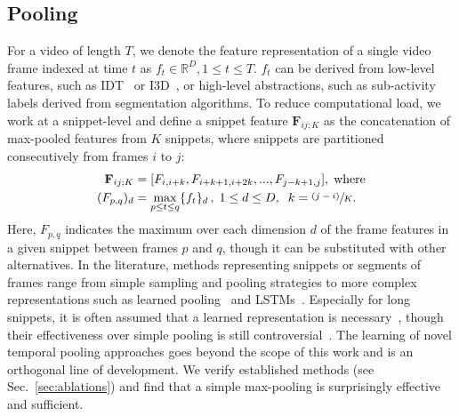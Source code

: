 \documentclass[runningheads]{llncs}
\begin{document}
\subsection{Pooling} 
For a video of length $T$, we denote the feature representation of a single video frame indexed at time $t$ as $f_t \in \mathbb{R}^{D}, 1\leq t \leq T$. $f_t$ can be derived from low-level features, such as IDT~\cite{wang2013action} or I3D~\cite{carreira2017quo}, or high-level abstractions, such as sub-activity labels derived from segmentation algorithms. To reduce computational load, we work at a snippet-level and define a snippet feature $\textbf{F}_{ij;K}$ as the concatenation of max-pooled features from $K$ snippets, where snippets are partitioned consecutively from frames $i$ to $j$: 
\begin{align}\label{eqn:maxpool}
\begin{split} 
\textbf{F}_{ij;K} & = [F_{i,i+k}, F_{i+k+1,i+2k}, ..., F_{j-k+1,j}], \; \text{where} \\
 ( F_{p,q})_d & = \max\limits_{p \leq t \leq q} \{ f_{t}\}_d\,, \; 1\leq d \leq D,\;\; k=\sfrac{(j-i)}{K}.
\end{split} 
\end{align}
\noindent Here, $F_{p,q}$ indicates the maximum over each dimension $d$ of the frame features in a given snippet between frames $p$ and $q$, though it can be substituted with other alternatives. In the literature, methods representing snippets or segments of frames range from simple sampling and pooling strategies to more complex representations such as learned pooling~\cite{lin2018nextvlad} and LSTMs~\cite{ostyakov2018label}. Especially for long snippets, it is often assumed that a learned representation is necessary~\cite{girdhar2017actionvlad,lee20182nd}, though their effectiveness over simple pooling is still controversial~\cite{wang2016temporal}. The learning of novel temporal pooling approaches goes beyond the scope of this work and is an orthogonal line of development. We verify established methods (see Sec.~\ref{sec:ablations}) and find that a simple max-pooling is surprisingly effective and sufficient. 
\end{document}
